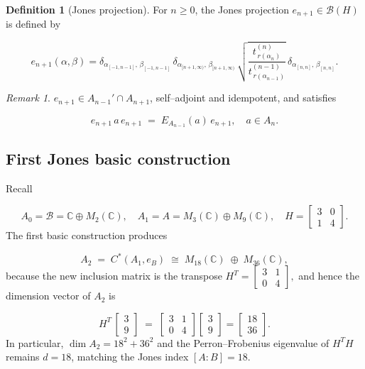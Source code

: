 \documentclass[11pt]{article}
\theoremstyle{mytheoremstyle}
\theoremstyle{definition}
\newtheorem{definition}[theorem]{\color{MyDarkBlue}Definition}
\theoremstyle{remark}
\newtheorem{remark}[theorem]{\color{MyDarkGreen}Remark}
\newcommand{\bbC}{\mathbb{C}}
\begin{document}
\begin{definition}[Jones projection]\label{def:jones-proj}
For \(n\ge0\), the Jones projection
\(e_{n+1}\in\mathcal B(H)\) is defined by

\[
  e_{n+1}(\alpha,\beta)
  =\delta_{\alpha_{[-1,n-1]},\,\beta_{[-1,n-1]}}\, 
  \delta_{\alpha_{[n+1,\infty)},\,\beta_{[n+1,\infty)}}\, 
  \sqrt{\frac{t^{(n)}_{\,r(\alpha_n)}}
       {t^{(n-1)}_{\,r(\alpha_{n-1})}}}\, 
  \delta_{\alpha_{[n,n]},\,\beta_{[n,n]}}.
\]
\end{definition}


\begin{remark}
\(e_{n+1}\in A_{n-1}'\cap A_{n+1}\), self–adjoint and idempotent, and satisfies

\[
  e_{n+1}\,a\,e_{n+1}
  \;=\; 
  E_{A_{n-1}}(a)\,e_{n+1},
  \quad
  a\in A_n.
\]
\end{remark}

\subsection{First Jones basic construction}

Recall

\[
  A_0 = \mathcal{B} = \mathbb{C}\oplus M_2(\mathbb{C}),
  \quad
  A_1 = A = M_3(\bbC)\oplus M_9(\bbC),
  \quad
  H=\begin{bmatrix}3&0\\
  1&4\end{bmatrix}.
\]
The first basic construction produces

\[
  A_2 \;=\; C^*(A_1,e_{B}) \;\cong\; M_{18}(\mathbb{C})\;\oplus\;M_{36}(\mathbb{C}),
\]
because the new inclusion matrix is the transpose
\( H^{\!T} = \begin{bmatrix}3&1\\
0&4\end{bmatrix}, \)
and hence the dimension vector of \(A_2\) is

\[
  H^{\!T}\,\begin{bmatrix}3\\
9\end{bmatrix}
  \;=\; 
  \begin{bmatrix}3&1\\
  0&4\end{bmatrix}
  \begin{bmatrix}3\\
9\end{bmatrix}
  =\begin{bmatrix}18\\
36\end{bmatrix}.
\]
In particular, \(\dim A_2 = 18^2 + 36^2\) and the Perron–Frobenius eigenvalue
of \(H^{\!T}H\) remains \(d=18\), matching the Jones index \([A:B]=18\).
\end{document}
